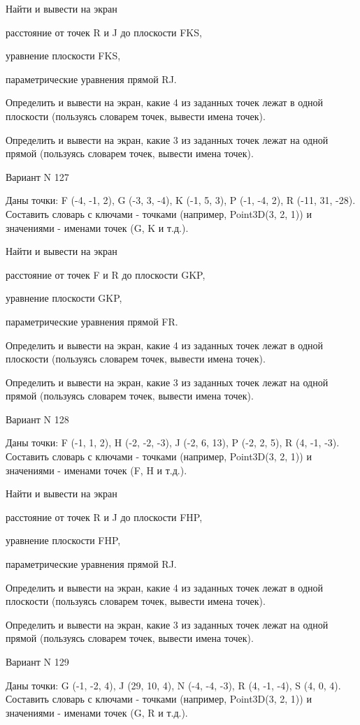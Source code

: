 \documentclass[11pt]{report}
\begin{document}
 
Найти и вывести на экран


расстояние от точек R и J до плоскости FKS,

 
уравнение плоскости FKS,

 
параметрические уравнения прямой RJ.


Определить и вывести на экран, какие 4 из заданных точек лежат в одной плоскости (пользуясь словарем точек, вывести имена точек).


Определить и вывести на экран, какие 3 из заданных точек лежат на одной прямой (пользуясь словарем точек, вывести имена точек).

Вариант N 127

Даны точки: F (-4, -1, 2), G (-3, 3, -4), K (-1, 5, 3), P (-1, -4, 2), R (-11, 31, -28).
Составить словарь с ключами - точками (например, Point3D(3, 2, 1)) и значениями - именами точек (G, K и т.д.).

 
Найти и вывести на экран


расстояние от точек F и R до плоскости GKP,

 
уравнение плоскости GKP,

 
параметрические уравнения прямой FR.


Определить и вывести на экран, какие 4 из заданных точек лежат в одной плоскости (пользуясь словарем точек, вывести имена точек).


Определить и вывести на экран, какие 3 из заданных точек лежат на одной прямой (пользуясь словарем точек, вывести имена точек).

Вариант N 128

Даны точки: F (-1, 1, 2), H (-2, -2, -3), J (-2, 6, 13), P (-2, 2, 5), R (4, -1, -3).
Составить словарь с ключами - точками (например, Point3D(3, 2, 1)) и значениями - именами точек (F, H и т.д.).

 
Найти и вывести на экран


расстояние от точек R и J до плоскости FHP,

 
уравнение плоскости FHP,

 
параметрические уравнения прямой RJ.


Определить и вывести на экран, какие 4 из заданных точек лежат в одной плоскости (пользуясь словарем точек, вывести имена точек).


Определить и вывести на экран, какие 3 из заданных точек лежат на одной прямой (пользуясь словарем точек, вывести имена точек).

Вариант N 129

Даны точки: G (-1, -2, 4), J (29, 10, 4), N (-4, -4, -3), R (4, -1, -4), S (4, 0, 4).
Составить словарь с ключами - точками (например, Point3D(3, 2, 1)) и значениями - именами точек (G, R и т.д.).
\end{document}
